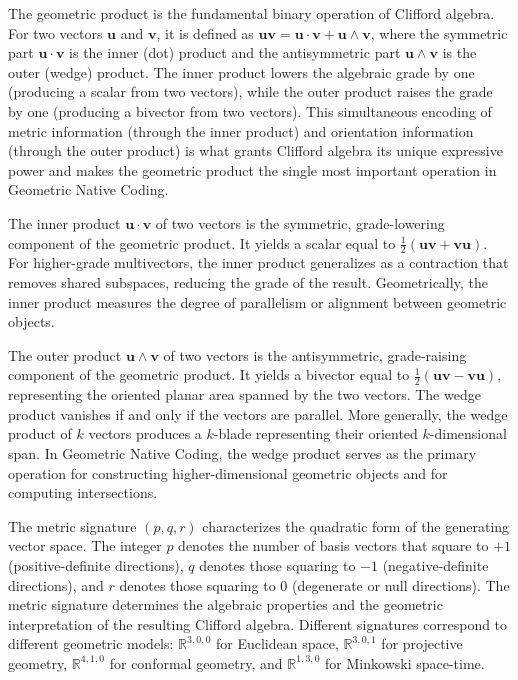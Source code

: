 \documentclass[manuscript, nonacm, review=false]{acmart}
\theoremstyle{definition}
\theoremstyle{plain}
\newcommand{\R}{\mathbb{R}}
\begin{document}
\begin{description}[style=unboxed, leftmargin=0cm, font=\bfseries]
\item[Geometric Product]
The geometric product is the fundamental binary operation of Clifford algebra. For two vectors $\mathbf{u}$ and $\mathbf{v}$, it is defined as $\mathbf{u}\mathbf{v} = \mathbf{u} \cdot \mathbf{v} + \mathbf{u} \wedge \mathbf{v}$, where the symmetric part $\mathbf{u} \cdot \mathbf{v}$ is the inner (dot) product and the antisymmetric part $\mathbf{u} \wedge \mathbf{v}$ is the outer (wedge) product. The inner product lowers the algebraic grade by one (producing a scalar from two vectors), while the outer product raises the grade by one (producing a bivector from two vectors). This simultaneous encoding of metric information (through the inner product) and orientation information (through the outer product) is what grants Clifford algebra its unique expressive power and makes the geometric product the single most important operation in Geometric Native Coding.

\item[Inner Product (Contraction)]
The inner product $\mathbf{u} \cdot \mathbf{v}$ of two vectors is the symmetric, grade-lowering component of the geometric product. It yields a scalar equal to $\frac{1}{2}(\mathbf{u}\mathbf{v} + \mathbf{v}\mathbf{u})$. For higher-grade multivectors, the inner product generalizes as a contraction that removes shared subspaces, reducing the grade of the result. Geometrically, the inner product measures the degree of parallelism or alignment between geometric objects.

\item[Outer Product (Wedge Product)]
The outer product $\mathbf{u} \wedge \mathbf{v}$ of two vectors is the antisymmetric, grade-raising component of the geometric product. It yields a bivector equal to $\frac{1}{2}(\mathbf{u}\mathbf{v} - \mathbf{v}\mathbf{u})$, representing the oriented planar area spanned by the two vectors. The wedge product vanishes if and only if the vectors are parallel. More generally, the wedge product of $k$ vectors produces a $k$-blade representing their oriented $k$-dimensional span. In Geometric Native Coding, the wedge product serves as the primary operation for constructing higher-dimensional geometric objects and for computing intersections.

\item[Metric Signature]
The metric signature $(p, q, r)$ characterizes the quadratic form of the generating vector space. The integer $p$ denotes the number of basis vectors that square to $+1$ (positive-definite directions), $q$ denotes those squaring to $-1$ (negative-definite directions), and $r$ denotes those squaring to $0$ (degenerate or null directions). The metric signature determines the algebraic properties and the geometric interpretation of the resulting Clifford algebra. Different signatures correspond to different geometric models: $\R^{3,0,0}$ for Euclidean space, $\R^{3,0,1}$ for projective geometry, $\R^{4,1,0}$ for conformal geometry, and $\R^{1,3,0}$ for Minkowski space-time.


\end{description}
\end{document}
